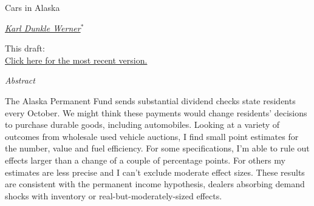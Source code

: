 \documentclass[11pt,letterpaper,oneside]{article}
\begin{document}
\thispagestyle{empty}
\setcounter{page}{0}
\vspace*{0.7in plus 0.3in minus 0.3in}

\begin{center}
    {\Huge Cars in Alaska}

    \href{mailto:karldw@berkeley.edu}{\textit{\Large Karl Dunkle Werner}}$^*$

\vspace{1em}
  This draft:
    \href{https://github.com/karldw/second_year_paper/tree/\gitHash}{
    \gitCommitterDate{}
    }
    \\
    \href{http://karldw.org/second_year_paper.pdf}{Click here for the most recent version.}
\end{center}

\vspace{2in plus 1in minus 0.7in}

\begin{center}
    \begin{minipage}{0.7\linewidth}
        \begin{center}
            \textit{Abstract}
        \end{center}
        The Alaska Permanent Fund sends substantial dividend checks state residents every October.
        We might think these payments would change residents' decisions to purchase durable goods, including automobiles.
        Looking at a variety of outcomes from wholesale used vehicle auctions, I find small point estimates for the number, value and fuel efficiency.
        For some specifications, I'm able to rule out effects larger than a change of a couple of percentage points.
        For others my estimates are less precise and I can't exclude moderate effect sizes.
        These results are consistent with the permanent income hypothesis, dealers absorbing demand shocks with inventory or real\hyp{}but\hyp{}moderately\hyp{}sized effects.
    \end{minipage}
\end{center}
\end{document}

